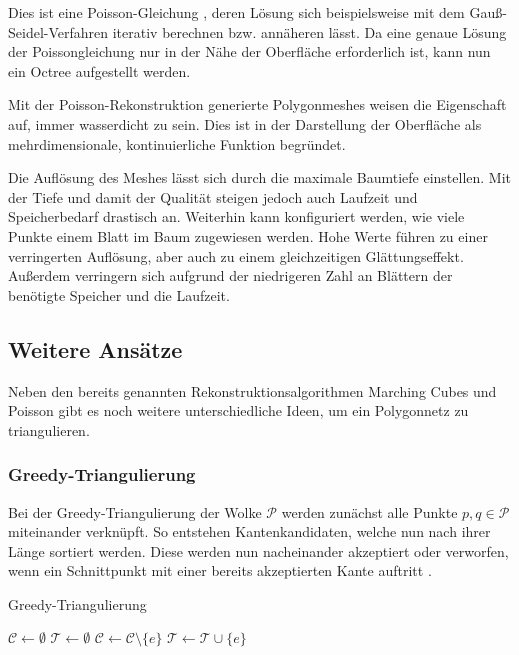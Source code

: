 Dies ist eine Poisson-Gleichung \cite[Kap. 2]{ponce2016pde}, deren Lösung sich beispielsweise mit dem Gauß-Seidel-Verfahren iterativ berechnen bzw. annäheren lässt.
Da eine genaue Lösung der Poissongleichung nur in der Nähe der Oberfläche erforderlich ist, kann nun ein Octree aufgestellt werden.

Mit der Poisson-Rekonstruktion generierte Polygonmeshes weisen die Eigenschaft auf, immer wasserdicht zu sein.
Dies ist in der Darstellung der Oberfläche als mehrdimensionale, kontinuierliche Funktion begründet.

Die Auflösung des Meshes lässt sich durch die maximale Baumtiefe einstellen.
Mit der Tiefe und damit der Qualität steigen jedoch auch Laufzeit und Speicherbedarf drastisch an.
Weiterhin kann konfiguriert werden, wie viele Punkte einem Blatt im Baum zugewiesen werden.
Hohe Werte führen zu einer verringerten Auflösung, aber auch zu einem gleichzeitigen Glättungseffekt.
Außerdem verringern sich aufgrund der niedrigeren Zahl an Blättern der benötigte Speicher und die Laufzeit.


\subsection{Weitere Ansätze}
\label{subsec:triangulation-others}

Neben den bereits genannten Rekonstruktionsalgorithmen Marching Cubes und Poisson gibt es noch weitere unterschiedliche Ideen, um ein Polygonnetz zu triangulieren.

\subsubsection{Greedy-Triangulierung}
\label{subsubsec:greedy-triangulierung}

Bei der Greedy-Triangulierung der Wolke $\mathcal{P}$ werden zunächst alle Punkte $p, q \in \mathcal{P}$ miteinander verknüpft.
So entstehen Kantenkandidaten, welche nun nach ihrer Länge sortiert werden.
Diese werden nun nacheinander akzeptiert oder verworfen, wenn ein Schnittpunkt mit einer bereits akzeptierten Kante auftritt \cite[235--237]{preparata1985computational}.

\begin{algorithm}
\caption{Greedy-Triangulierung}
\label{alg:greedy-triangulierung}
\begin{algorithmic}
\State $\mathcal{C} \gets \emptyset$
	\State {}
\EndFor
\State {}
\State $\mathcal{T} \gets \emptyset$
			\State $\mathcal{C} \gets \mathcal{C} \setminus \{e\}$
		\EndIf
	\EndFor
	\State $\mathcal{T} \gets \mathcal{T} \cup \{e\}$
\EndFor
\State {}
\end{algorithmic}
\end{algorithm}

